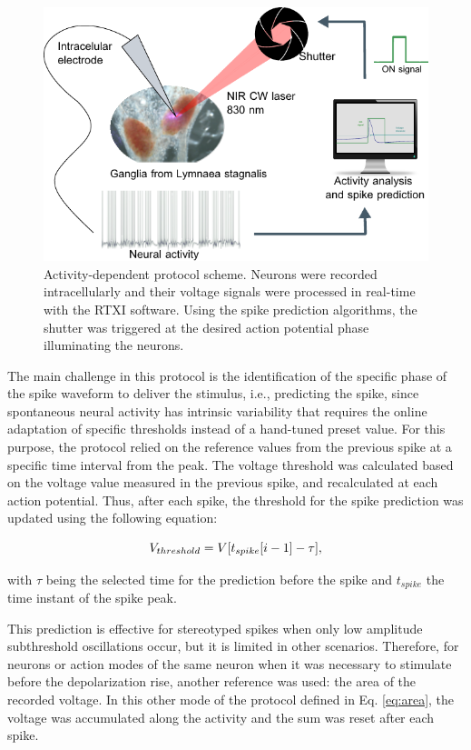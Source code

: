 \begin{figure}[htb!]
	\includegraphics[width=\textwidth]{img/laser/activity_dependent_protocol.pdf}
	\caption{Activity-dependent protocol scheme. Neurons were recorded intracellularly and their voltage signals were processed in real-time with the RTXI software. Using the spike prediction algorithms, the shutter was triggered at the desired action potential phase illuminating the neurons.}
	\label{fig:activity dependent protocol}
\end{figure}


The main challenge in this protocol is the identification of the specific phase of the spike waveform to deliver the stimulus, i.e., predicting the spike, since spontaneous neural activity has intrinsic variability that requires the online adaptation of specific thresholds instead of a hand-tuned preset value. For this purpose, the protocol relied on the reference values from the previous spike at a specific time interval from the peak. The voltage threshold was calculated based on the voltage value measured in the previous spike, and recalculated at each action potential. Thus, after each spike, the threshold for the spike prediction was updated using the following equation:

\begin{equation}
	\centering 
	V_{threshold}=V[t_{spike}[i-1]-\tau],
\end{equation}

\noindent with $\tau$ being the selected time for the prediction before the spike and $t_{spike}$ the time instant of the spike peak.

This prediction is effective for stereotyped spikes when only low amplitude subthreshold oscillations occur, but it is limited in other scenarios. Therefore, for neurons or action modes of the same neuron when it was necessary to stimulate before the depolarization rise, another reference was used: the area of the recorded voltage. In this other mode of the protocol defined in Eq. \ref{eq:area}, the voltage was accumulated along the activity and the sum was reset after each spike. 

